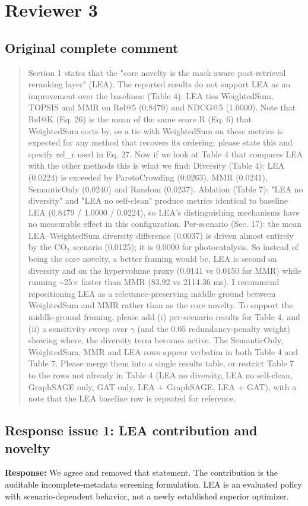 \documentclass[11pt,a4paper]{article}
\begin{document}
\clearpage\section*{Reviewer 3}\subsection*{Original complete comment}
\begin{quote}\small Section 1 states that the "core novelty is the mask-aware post-retrieval reranking layer" (LEA). The reported results do not support LEA as an improvement over the baselines: (Table 4): LEA ties WeightedSum, TOPSIS and MMR on Rel@5 (0.8479) and NDCG@5 (1.0000). Note that Rel@K (Eq. 26) is the mean of the same score R (Eq. 6) that WeightedSum sorts by, so a tie with WeightedSum on these metrics is expected for any method that recovers its ordering; please state this and specify rel\_r used in Eq. 27. Now if we look at Table 4 that compares LEA with the other methods this is what we find: Diversity (Table 4): LEA (0.0224) is exceeded by ParetoCrowding (0.0263), MMR (0.0241), SemanticOnly (0.0240) and Random (0.0237). Ablation (Table 7): "LEA no diversity" and "LEA no self-clean" produce metrics identical to baseline LEA (0.8479 / 1.0000 / 0.0224), so LEA's distinguishing mechanisms have no measurable effect in this configuration. Per-scenario (Sec. 17): the mean LEA--WeightedSum diversity difference (0.0037) is driven almost entirely by the CO$_2$ scenario (0.0125); it is 0.0000 for photocatalysis. So instead of being the core novelty, a better framing would be, LEA is second on diversity and on the hypervolume proxy (0.0141 vs 0.0150 for MMR) while running \textasciitilde{}25$\times$ faster than MMR (83.92 vs 2114.36 ms). I recommend repositioning LEA as a relevance-preserving middle ground between WeightedSum and MMR rather than as the core novelty. To support the middle-ground framing, please add (i) per-scenario results for Table 4, and (ii) a sensitivity sweep over $\gamma$ (and the 0.05 redundancy-penalty weight) showing where, the diversity term becomes active. The SemanticOnly, WeightedSum, MMR and LEA rows appear verbatim in both Table 4 and Table 7. Please merge them into a single results table, or restrict Table 7 to the rows not already in Table 4 (LEA no diversity, LEA no self-clean, GraphSAGE only, GAT only, LEA + GraphSAGE, LEA + GAT), with a note that the LEA baseline row is repeated for reference.\end{quote}
\subsection*{Response issue 1: LEA contribution and novelty}
\textbf{Response:} We agree and removed that statement. The contribution is the auditable incomplete-metadata screening formulation. LEA is an evaluated policy with scenario-dependent behavior, not a newly established superior optimizer.
\end{document}
